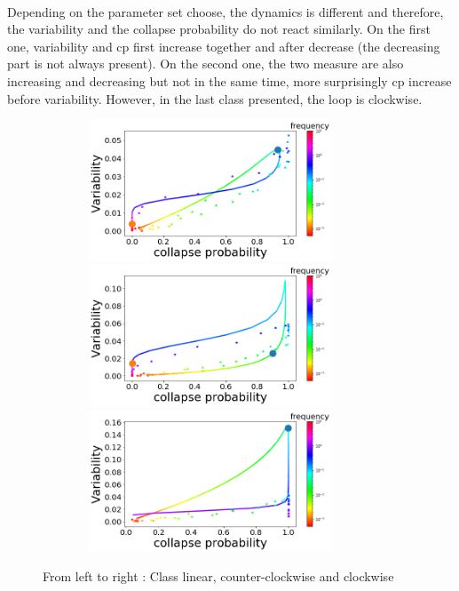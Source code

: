 \documentclass{article}
\begin{document}
\paragraph{}
Depending on the parameter set choose, the dynamics is different and therefore, the variability and the collapse probability do not react similarly. On the first one, variability and cp first increase together and after decrease (the decreasing part is not always present). On the second one, the two measure are also increasing and decreasing but not in the same time, more surprisingly cp increase before variability. However, in the last class presented, the loop is clockwise.


\begin{figure}[h!]
\begin{center}
\includegraphics[width=10cm, height = 4.2cm]{case_linear.png}
\includegraphics[width=10cm, height = 4.2cm]{case_triangular.png}
\includegraphics[width=10cm, height = 4.2cm]{case_clockwise.png}
\end{center}
\caption{\label{fig:temp}From left to right : Class linear, counter-clockwise and clockwise} %
\end{figure}
\end{document}

